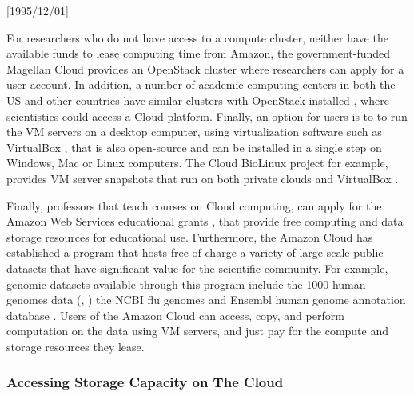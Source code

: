 \NeedsTeXFormat{LaTeX2e}[1995/12/01] \documentclass[10pt]{bmc_article}
\newenvironment{bmcformat}{\begin{raggedright}\baselineskip20pt\sloppy\setboolean{publ}{false}}{\end{raggedright}\baselineskip20pt\sloppy}
\begin{document}
\begin{bmcformat}
For researchers who do not have access to a compute cluster, neither have the available funds to lease computing time from 
Amazon, the government-funded Magellan Cloud \cite{magellan} provides an OpenStack cluster where researchers can apply 
for a user account. In addition, a number of academic computing centers in both the US and other countries have similar clusters 
with OpenStack installed \cite{openstackinstalls}, where scientistics could access a Cloud platform. Finally, an option for users is 
to to run the VM servers on a desktop  computer, using virtualization software such as VirtualBox \cite{vbox}, that is also 
open-source and can be installed in a single step on Windows, Mac or Linux  computers. The Cloud BioLinux project for example, 
provides  VM server snapshots that run  on both private clouds and VirtualBox \cite{cblorg}. \pb

Finally, professors that teach courses on Cloud computing, can apply for the Amazon Web Services educational grants 
\cite{awsgrants}, that provide free computing and data storage resources for educational use. Furthermore, the Amazon 
Cloud has established a program \cite{awspublicdata} that hosts free of charge a variety of large-scale public datasets that 
have significant value for the scientific community. For example, genomic datasets available through this program include 
the 1000 human genomes  data (\cite{Clarke2012}, \cite{aws1000gen}) the NCBI flu genomes \cite{awsflu} and Ensembl 
human genome annotation database \cite{awsensembl}. Users of the Amazon Cloud can access, copy, and perform computation 
on the  data using VM servers, and just pay for the compute and storage resources they lease. \pb

\subsubsection*{Accessing Storage Capacity on The Cloud}


\end{bmcformat}
\end{document}
